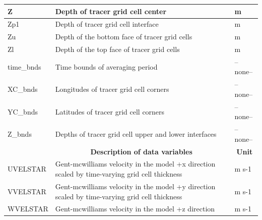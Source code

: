 \begin{longtable}{|m{}|m{}|m{}|}
Z &Depth of tracer grid cell center &m  \\ \hline
Zp1 &Depth of tracer grid cell interface &m  \\ \hline
Zu &Depth of the bottom face of tracer grid cells &m  \\ \hline
Zl &Depth of the top face of tracer grid cells &m  \\ \hline
time\_bnds &Time bounds of averaging period &--none--  \\ \hline
XC\_bnds &Longitudes of tracer grid cell corners &--none--  \\ \hline
YC\_bnds &Latitudes of tracer grid cell corners &--none--  \\ \hline
Z\_bnds &Depths of tracer grid cell upper and lower interfaces &--none--  \\ \hline
\rowcolor{lightgray} \multicolumn{1}{|c|}{\textbf{Variables}} & \multicolumn{1}{|c|}{\textbf{Description of data variables}} &  \multicolumn{1}{|c|}{\textbf{Unit}}\\ \hline
UVELSTAR &Gent-mcwilliams velocity in the model +x direction scaled by time-varying grid cell thickness &m s-1  \\ \hline
VVELSTAR &Gent-mcwilliams velocity in the model +y direction scaled by time-varying grid cell thickness &m s-1  \\ \hline
WVELSTAR &Gent-mcwilliams velocity in the model +z direction &m s-1  \\ \hline
\end{longtable}

\newp
\pagebreak
